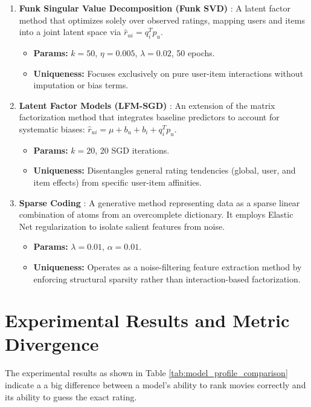\documentclass[conference]{IEEEtran}
\begin{document}
\begin{enumerate}
	\item \textbf{Funk Singular Value Decomposition (Funk SVD)} \cite{funk2006}: A latent factor method that optimizes solely over observed ratings, mapping users and items into a joint latent space via $\hat{r}_{ui} = q_i^T p_u$. 
	\begin{itemize}
		\item \textbf{Params:} $k=50$, $\eta=0.005$, $\lambda=0.02$, 50 epochs.
		\item \textbf{Uniqueness:} Focuses exclusively on pure user-item interactions without imputation or bias terms.
	\end{itemize}
	
	\item \textbf{Latent Factor Models (LFM-SGD)} \cite{koren2009}: An extension of the matrix factorization method that integrates baseline predictors to account for systematic biases: $\hat{r}_{ui} = \mu + b_u + b_i + q_i^T p_u$. 
	\begin{itemize}
		\item \textbf{Params:} $k=20$, 20 SGD iterations.
		\item \textbf{Uniqueness:} Disentangles general rating tendencies (global, user, and item effects) from specific user-item affinities.
	\end{itemize}
	
	\item \textbf{Sparse Coding} \cite{olshausen1996}: A generative method representing data as a sparse linear combination of atoms from an overcomplete dictionary. It employs Elastic Net regularization to isolate salient features from noise.
	\begin{itemize}
		\item \textbf{Params:} $\lambda=0.01$, $\alpha=0.01$.
		\item \textbf{Uniqueness:} Operates as a noise-filtering feature extraction method by enforcing structural sparsity rather than interaction-based factorization.
	\end{itemize}
\end{enumerate}

\vspace{2mm}

\section{\textbf{Experimental Results and Metric Divergence}}

The experimental results as shown in Table \ref{tab:model_profile_comparison} indicate a a big difference between a model's ability to rank movies correctly and its ability to guess the exact rating. 
\end{document}
